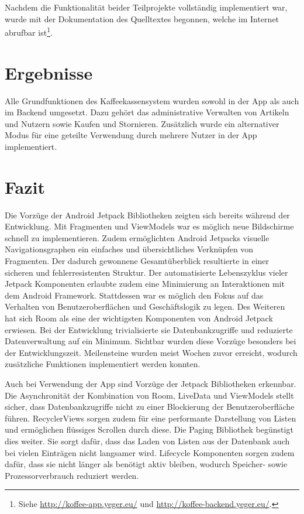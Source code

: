 \documentclass[a4paper, 11pt]{article}
\begin{document}
Nachdem die Funktionalität beider Teilprojekte vollständig implementiert war, wurde mit der Dokumentation des Quelltextes begonnen, welche im Internet abrufbar ist\footnote{Siehe \url{http://koffee-app.yeger.eu/} und \url{http://koffee-backend.yeger.eu/}.}.

\section{Ergebnisse}
\label{sec:results}
Alle Grundfunktionen des Kaffeekassensystem wurden sowohl in der App als auch im Backend umgesetzt.
Dazu gehört das administrative Verwalten von Artikeln und Nutzern sowie Kaufen und Stornieren.
Zusätzlich wurde ein alternativer Modus für eine geteilte Verwendung durch mehrere Nutzer in der App implementiert.

\section{Fazit}
\label{sec:conclusion}
Die Vorzüge der Android Jetpack Bibliotheken zeigten sich bereits während der Entwicklung.
Mit Fragmenten und ViewModels war es möglich neue Bildschirme schnell zu implementieren.
Zudem ermöglichten Android Jetpacks visuelle Navigationsgraphen ein einfaches und übersichtliches Verknüpfen von Fragmenten.
Der dadurch gewonnene Gesamtüberblick resultierte in einer sicheren und fehlerresistenten Struktur.
Der automatisierte Lebenszyklus vieler Jetpack Komponenten erlaubte zudem eine Minimierung an Interaktionen mit dem Android Framework.
Stattdessen war es möglich den Fokus auf das Verhalten von Benutzeroberflächen und Geschäftslogik zu legen.
Des Weiteren hat sich Room als eine der wichtigsten Komponenten von Android Jetpack erwiesen.
Bei der Entwicklung trivialisierte sie Datenbankzugriffe und reduzierte Datenverwaltung auf ein Minimum.
Sichtbar wurden diese Vorzüge besonders bei der Entwicklungszeit.
Meilensteine wurden meist Wochen zuvor erreicht, wodurch zusätzliche Funktionen implementiert werden konnten.

Auch bei Verwendung der App sind Vorzüge der Jetpack Bibliotheken erkennbar.
Die Asynchronität der Kombination von Room, LiveData und ViewModels stellt sicher, dass Datenbankzugriffe nicht zu einer Blockierung der Benutzeroberfläche führen.
RecyclerViews sorgen zudem für eine performante Darstellung von Listen und ermöglichen flüssiges Scrollen durch diese.
Die Paging Bibliothek begünstigt dies weiter.
Sie sorgt dafür, dass das Laden von Listen aus der Datenbank auch bei vielen Einträgen nicht langsamer wird.
Lifecycle Komponenten sorgen zudem dafür, dass sie nicht länger als benötigt aktiv bleiben, wodurch Speicher- sowie Prozessorverbrauch reduziert werden.
\end{document}
